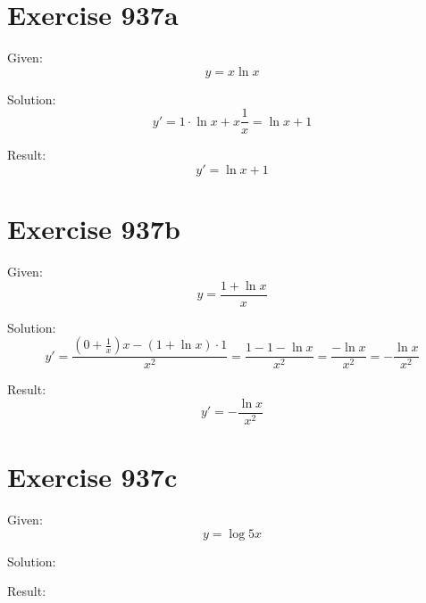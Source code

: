 \documentclass[a4paper, 10pt]{scrartcl}
\begin{document}
\section{Exercise 937a}

Given:
\[
y = x\ln{x}
\]

Solution:
\[
y' = 1\cdot\ln{x} + x\frac{1}{x} = \ln{x} + 1
\]

Result:
\[
y' = \ln{x} + 1
\]

\section{Exercise 937b}

Given:
\[
y = \frac{1 + \ln{x}}{x}
\]

Solution:
\[
y' = \frac{(0 + \frac{1}{x})x - (1 + \ln{x})\cdot1}{x^{2}} = \frac{1 - 1 - \ln{x}}{x^{2}} = \frac{-\ln{x}}{x^{2}} = -\frac{\ln{x}}{x^{2}}
\]

Result:
\[
y' = -\frac{\ln{x}}{x^{2}}
\]

\section{Exercise 937c}

Given:
\[
y = \log{5x}
\]

Solution:

Result:
\end{document}
